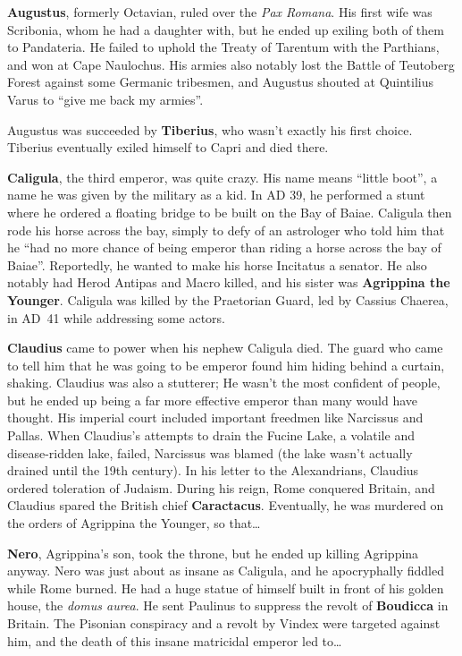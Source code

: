 \textbf{Augustus}, formerly Octavian, ruled over the \textit{Pax Romana}.
His first wife was Scribonia, whom he had a daughter with, but he ended up exiling both of them to Pandateria.
He failed to uphold the Treaty of Tarentum with the Parthians, and won at Cape Naulochus.
His armies also notably lost the Battle of Teutoberg Forest against some Germanic tribesmen,
and Augustus shouted at Quintilius Varus to ``give me back my armies''.

Augustus was succeeded by \textbf{Tiberius}, who wasn't exactly his first choice.
Tiberius eventually exiled himself to Capri and died there.

\textbf{Caligula}, the third emperor, was quite crazy.
His name means ``little boot'', a name he was given by the military as a kid.
In AD 39, he performed a stunt where he ordered a floating bridge to be built on the Bay of Baiae.
Caligula then rode his horse across the bay, simply to defy of an astrologer who told him that he
``had no more chance of being emperor than riding a horse across the bay of Baiae''.
Reportedly, he wanted to make his horse Incitatus a senator.
He also notably had Herod Antipas and Macro killed,
and his sister was \textbf{Agrippina the Younger}.
Caligula was killed by the Praetorian Guard, led by Cassius Chaerea, in AD~41 while addressing some actors.

\textbf{Claudius} came to power when his nephew Caligula died.
The guard who came to tell him that he was going to be emperor found him hiding behind a curtain, shaking.
Claudius was also a stutterer;
He wasn't the most confident of people,
but he ended up being a far more effective emperor than many would have thought.
His imperial court included important freedmen like Narcissus and Pallas.
When Claudius's attempts to drain the Fucine Lake, a volatile and disease-ridden lake, failed,
Narcissus was blamed (the lake wasn't actually drained until the 19th century).
In his letter to the Alexandrians, Claudius ordered toleration of Judaism.
During his reign, Rome conquered Britain, and Claudius spared the British chief \textbf{Caractacus}.
Eventually, he was murdered on the orders of Agrippina the Younger, so that\ldots{}

\textbf{Nero}, Agrippina's son, took the throne, but he ended up killing Agrippina anyway.
Nero was just about as insane as Caligula, and he apocryphally fiddled while Rome burned.
He had a huge statue of himself built in front of his golden house, the \textit{domus aurea}.
He sent Paulinus to suppress the revolt of \textbf{Boudicca} in Britain.
The Pisonian conspiracy and a revolt by Vindex were targeted against him,
and the death of this insane matricidal emperor led to\ldots{}

